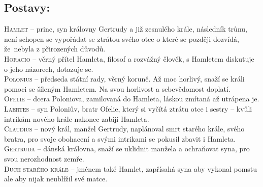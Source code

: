 \documentclass{extarticle} %
\begin{document}
\subsection*{Postavy:}
\noindent 
\textsc{Hamlet --} princ, syn královny Gertrudy a již zesnulého krále,
následník trůnu, není schopen se vypořádat se ztrátou svého otce o které se později dozvídá,
že~nebyla z přirozených důvodů. \\
\textsc{Horacio --} věrný přítel Hamleta, filosof a rozvážný člověk,
s Hamletem diskutuje o jeho názorech, dotazuje se. \\
\textsc{Polonius --} předseda státní rady, věrný koruně. Až moc horlivý,
snaží se králi pomoci se šíleným Hamletem. Na svou horlivost a sebevědomost doplatí. \\
\textsc{Ofelie --} dcera Poloniova, zamilovaná do Hamleta, láskou zmítaná až utrápena je. \\
\textsc{Laertes --} syn Poloniův, bratr Ofelie, který si vyčítá ztrátu otce i sestry
-- kvůli intrikám nového krále nakonec zabíjí Hamleta. \\
\textsc{Claudius --} nový král, manžel Gertrudy, naplánoval smrt starého krále,
svého bratra, pro svoje obohacení a svými intrikami se pokusil zbavit i Hamleta. \\
\textsc{Gertruda --} dánská královna, snaží se uklidnit manžela a ochraňovat syna,
pro svou nerozhodnost zemře. \\
\textsc{Duch starého krále --} jménem také Hamlet,
zapřísahá syna aby vykonal pomstu ale aby nijak neublížil své matce.
\end{document}
